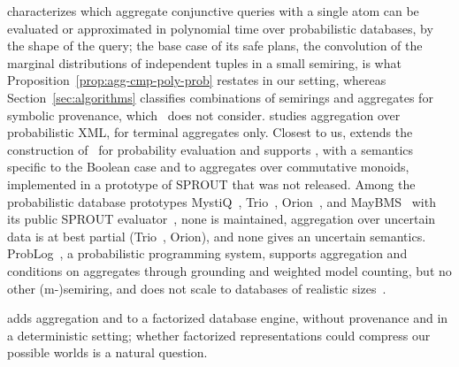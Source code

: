 \cite{re2009trichotomy} characterizes which aggregate conjunctive queries
with a single  atom can be evaluated or approximated in
polynomial time over probabilistic databases, by the shape of the query;
the base case of its safe plans, the convolution of the marginal
distributions of independent tuples in a small semiring, is what
Proposition~\ref{prop:agg-cmp-poly-prob} restates in our setting, whereas
Section~\ref{sec:algorithms} classifies combinations of semirings and
aggregates for symbolic provenance, which~\cite{re2009trichotomy} does
not consider. \cite{abiteboul2011capturing} studies
aggregation over probabilistic XML, for terminal aggregates only. Closest
to us, \cite{fink2012aggregation} extends the construction
of~\cite{amsterdamer2011provenance} for probability evaluation and
supports , with a semantics specific to the Boolean case and
to aggregates over commutative monoids, implemented in a prototype of
SPROUT that was not released. Among the probabilistic database prototypes
MystiQ~\cite{DBLP:conf/sigmod/BoulosDMMRS05},
Trio~\cite{dblp:conf/vldb/agrawalbshnsw06}, Orion~\cite{singh2008orion},
and MayBMS~\cite{huang2009maybms} with its public SPROUT
evaluator~\cite{DBLP:conf/icde/OlteanuHK09}, none is maintained,
aggregation over uncertain data is at best partial
(Trio~\cite{murthy2011aggregation}, Orion), and none gives 
an uncertain semantics.
ProbLog~\cite{DBLP:journals/tplp/FierensBRSGTJR15,DBLP:conf/pkdd/DriesKMRBVR15},
a probabilistic programming system, supports aggregation and conditions
on aggregates through grounding and weighted model counting, but no other
(m-)semiring, and does not scale to databases of realistic
sizes~\cite{sen2026provsql}.

\cite{bakibayev2013aggregation} adds aggregation and  to a
factorized database engine, without provenance and in a deterministic
setting; whether factorized representations could compress our possible
worlds is a natural question.

